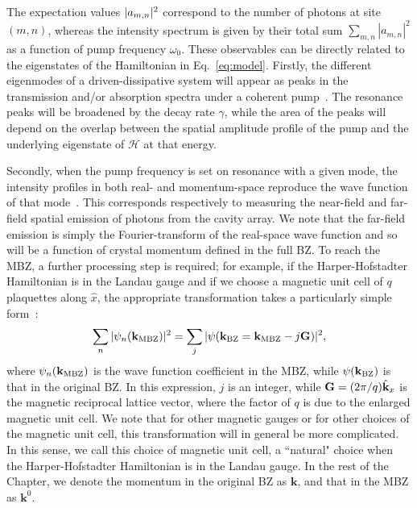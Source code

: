 The expectation values $\vert a_{m,n} \vert^2$ correspond to the number of
photons at site $(m,n)$, whereas the intensity spectrum is given by
their total sum $\sum_{m,n} |a_{m,n}|^2$ as a function of pump
frequency $\omega_0$. These observables can be directly related to the
eigenstates of the Hamiltonian in Eq.~\eqref{eq:model}. Firstly, the
different eigenmodes of a driven-dissipative system will appear as
peaks in the transmission and/or absorption spectra under a coherent
pump~\cite{carusotto2013fluids}. The resonance peaks will be broadened
by the decay rate $\gamma$, while the area of the peaks will depend on
the overlap between the spatial amplitude profile of the pump and the
underlying eigenstate of $\mathcal{H}$ at that energy.

Secondly, when the pump frequency is set on resonance with a given
mode, the intensity profiles in both real- and momentum-space
reproduce the wave function of that
mode~\cite{carusotto2013fluids}. This corresponds respectively to
measuring the near-field and far-field spatial emission of photons
from the cavity array. We note that the far-field emission is simply
the Fourier-transform of the real-space wave function and so will be a
function of crystal momentum defined in the full BZ. To reach the MBZ,
a further processing step is required; for example, if the
Harper-Hofstadter Hamiltonian is in the Landau gauge and if we choose
a magnetic unit cell of $q$ plaquettes along $\hat{x}$, the
appropriate transformation takes a particularly simple
form~\cite{price2014magnetic}:
%
\begin{equation} \label{eq:trans} \sum_n
\vert \psi_n(\mathbf{k}_\mathrm{MBZ}) \vert^2 = \sum_j
\vert \psi(\mathbf{k}_\mathrm{BZ} = \mathbf{k}_\mathrm{MBZ}- j\mathbf{G}) \vert^2 ,
\end{equation}
%
where $\psi_n(\mathbf{k}_\mathrm{MBZ})$ is the wave function coefficient
in the MBZ, while $\psi(\mathbf{k}_\mathrm{BZ})$ is that in the original
BZ. In this expression, $j$ is an integer, while
$\mathbf{G} = (2\pi/q) \hat{\mathbf{k}}_x $ is the magnetic reciprocal lattice
vector, where the factor of $q$ is due to the enlarged magnetic unit
cell. We note that for other magnetic gauges or for other choices of
the magnetic unit cell, this transformation will in general be more
complicated. In this sense, we call this choice of magnetic unit cell,
a ``natural" choice when the Harper-Hofstadter Hamiltonian is in the
Landau gauge.  In the rest of the Chapter, we denote the momentum in
the original BZ as $\mathbf{k}$, and that in the MBZ as
$\mathbf{k}^0$.

